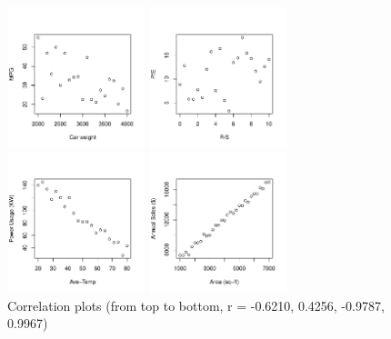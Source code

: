 \documentclass[11pt, chapterprefix=true]{scrbook}\usepackage[]{graphicx}\usepackage[]{color}
\begin{document}
\begin{figure}[ht]



\caption{Correlation plots (from top to bottom, r = -0.6210, 0.4256, -0.9787, 0.9967)}


{\centering \includegraphics[width=4cm]{figure/LBL13b-1} 

}





{\centering \includegraphics[width=4cm]{figure/LBL13c-1} 

}





{\centering \includegraphics[width=4cm]{figure/LBL13d-1} 

}





{\centering \includegraphics[width=4cm]{figure/LBL13e-1} 

}



\end{figure}
\end{document}
